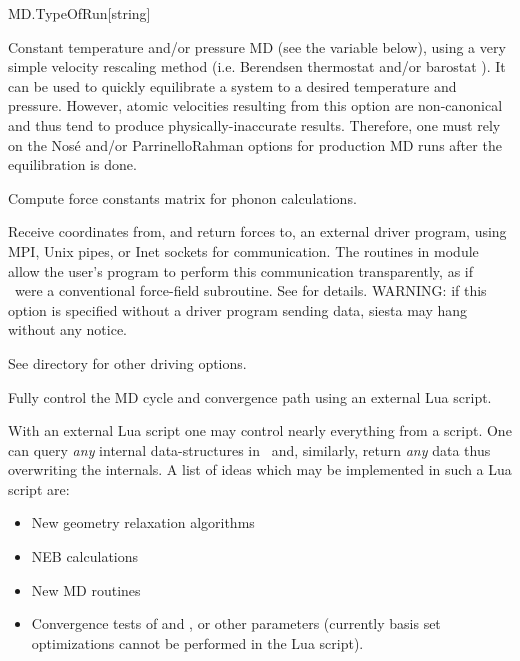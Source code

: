 \begin{fdfentry}{MD.TypeOfRun}[string]
\begin{fdfoptions}
    \option[Anneal]%
    Constant temperature and/or pressure MD (see the variable
     below), using a very simple velocity rescaling method
    (i.e. Berendsen thermostat and/or barostat \cite{Berendsen84}). It can be
    used to quickly equilibrate a system to a desired temperature and pressure.
    However, atomic velocities resulting from this option are non-canonical and
    thus tend to produce physically-inaccurate results. Therefore, one must
    rely on the Nos\'e and/or ParrinelloRahman options for production MD runs
    after the equilibration is done.

    \option[FC]%
    Compute force constants matrix for
    phonon calculations.

    Receive coordinates from, and return forces to, an external
    driver program, using MPI, Unix pipes, or Inet sockets for
    communication. The routines in module  allow the
    user's program to perform this communication transparently, as if
    \siesta\ were a conventional force-field subroutine. See
     for details. WARNING: if this
    option is specified without a driver program sending data, siesta
    may hang without any notice.

    See directory   for other driving
    options.

    \option[Lua]%
    Fully control the MD cycle and convergence path using an external
    Lua script.

    With an external Lua script one may control nearly everything from
    a script. One can query \emph{any} internal data-structures in
    \siesta\ and, similarly, return \emph{any} data thus overwriting
    the internals. A list of ideas which may be implemented in such a
    Lua script are:
    \begin{itemize}
      \item New geometry relaxation algorithms

      \item NEB calculations

      \item New MD routines

      \item Convergence tests of  and
      , or other parameters (currently basis
      set optimizations cannot be performed in the Lua script).


\end{itemize}
\end{fdfoptions}
\end{fdfentry}

